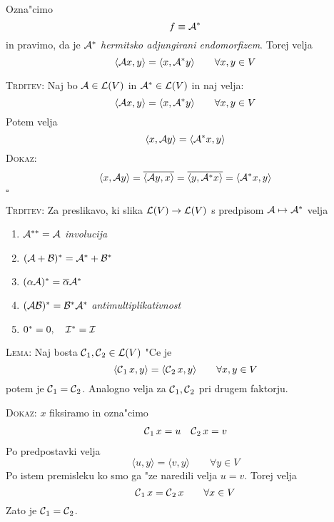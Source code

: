 Ozna"cimo
\begin{equation*}
f \equiv \mathcal{A}^*
\end{equation*}
in pravimo, da je $\mathcal{A}^*$ \emph{hermitsko adjungirani endomorfizem}. Torej velja
\begin{equation*}
\langle \mathcal{A} x, y \rangle = \langle x, \mathcal{A}^* y \rangle \qquad \forall x, y \in V
\end{equation*}

\textsc{Trditev:}
Naj bo $\mathcal{A} \in \mathcal{L}(V)$ in $\mathcal{A}^* \in \mathcal{L}(V)$ in naj velja:
\begin{equation*}
\langle \mathcal{A} x, y \rangle = \langle x, \mathcal{A}^* y \rangle \qquad \forall x,y \in V
\end{equation*}
Potem velja
\begin{equation*}
\langle x, \mathcal{A} y \rangle = \langle \mathcal{A}^* x, y \rangle
\end{equation*}
\textsc{Dokaz:}
\begin{equation*}
\langle x, \mathcal{A} y \rangle = \overline{\langle \mathcal{A} y, x \rangle} = \overline{\langle y, \mathcal{A}^* x \rangle} = \langle \mathcal{A}^* x, y \rangle
\end{equation*}
\hfill $\square$

\textsc{Trditev:} Za preslikavo, ki slika $\mathcal{L}(V) \to \mathcal{L}(V)$ s predpisom $\mathcal{A} \mapsto \mathcal{A}^*$ velja
\begin{enumerate}
    \item $\mathcal{A}^{**} = \mathcal{A}$ \emph{involucija}
    \item $(\mathcal{A} + \mathcal{B})^* = \mathcal{A}^* + \mathcal{B}^*$
    \item $(\alpha \mathcal{A})^* = \overline{\alpha} \mathcal{A}^*$
    \item $(\mathcal{A} \mathcal{B})^* = \mathcal{B}^* \mathcal{A}^*$ \emph{antimultiplikativnost}
    \item $0^* = 0, \quad \mathcal{I}^* = \mathcal{I}$
\end{enumerate}
\textsc{Lema:} Naj bosta $\operatorname{\mathcal{C}}_1, \operatorname{\mathcal{C}}_2 \in \mathcal{L}(V)$ "Ce je
\begin{equation*}
\langle \operatorname{\mathcal{C}}_1 x, y \rangle = \langle \operatorname{\mathcal{C}}_2 x, y \rangle \qquad \forall x, y \in V
\end{equation*}
potem je $\operatorname{\mathcal{C}}_1 = \operatorname{\mathcal{C}}_2$. Analogno velja za $\operatorname{\mathcal{C}}_1, \operatorname{\mathcal{C}}_2$ pri drugem faktorju.

\textsc{Dokaz:} $x$ fiksiramo in ozna"cimo
\begin{align*}
\operatorname{\mathcal{C}}_1 x = u && \operatorname{\mathcal{C}}_2 x = v
\end{align*}
Po predpostavki velja
\begin{equation*}
\langle u, y \rangle = \langle v, y \rangle \qquad \forall y \in V
\end{equation*}
Po istem premisleku ko smo ga "ze naredili velja $u = v$. Torej velja
\begin{equation*}
\operatorname{\mathcal{C}}_1 x = \operatorname{\mathcal{C}}_2 x \qquad \forall x \in V
\end{equation*}
Zato je $\operatorname{\mathcal{C}}_1 = \operatorname{\mathcal{C}}_2$.

